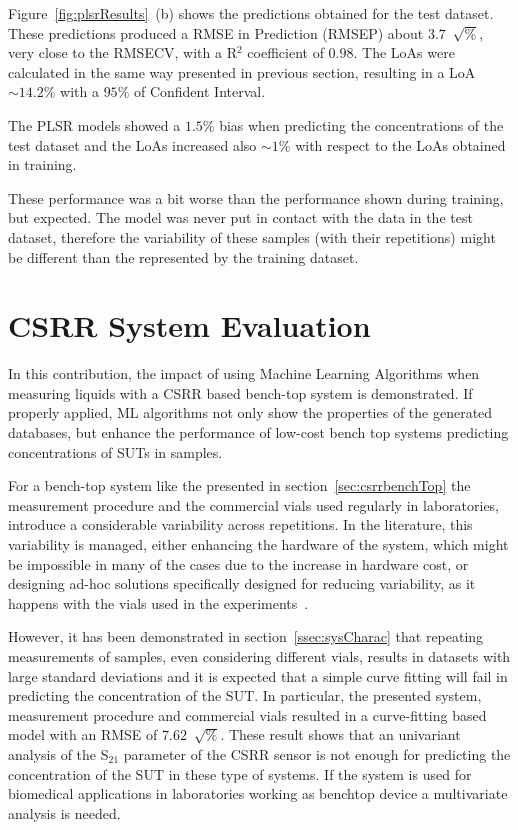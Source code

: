 \documentclass[journal,twoside,web]{ieeecolor}
\begin{document}
Figure~\ref{fig:plsrResults}~(b) shows the predictions obtained for the test dataset. These predictions produced a RMSE in Prediction (RMSEP) about $3.7$~$\sqrt{\%}$, very close to the RMSECV, with a R$^{2}$ coefficient of $0.98$. The LoAs were calculated in the same way presented in previous section, resulting in a LoA~$\sim14.2\%$ with a $95\%$ of Confident Interval. 

The PLSR models showed a $1.5\%$ bias when predicting the concentrations of the test dataset and the LoAs increased also $\sim1\%$ with respect to the LoAs obtained in training. 

These performance was a bit worse than the performance shown during training, but expected. The model was never put in contact with the data in the test dataset, therefore the variability of these samples (with their repetitions) might be different than the represented by the training dataset.

\section{CSRR System Evaluation}
\label{sec:csrrEval}

In this contribution, the impact of using Machine Learning Algorithms when measuring liquids with a CSRR based bench-top system is demonstrated. If properly applied, ML algorithms not only show the properties of the generated databases, but enhance the performance of low-cost bench top systems predicting concentrations of SUTs in samples.

For a bench-top system like the presented in section~\ref{sec:csrrbenchTop} the measurement procedure and the commercial vials used regularly in laboratories, introduce a considerable variability across repetitions. In the literature, this variability is managed, either enhancing the hardware of the system, which might be impossible in many of the cases due to the increase in hardware cost, or designing ad-hoc solutions specifically designed for reducing variability, as it happens with the vials used in the experiments~\cite{Omer2020, Omer2021}. 

However, it has been demonstrated in section~\ref{ssec:sysCharac} that repeating measurements of samples, even considering different vials, results in datasets with large standard deviations and it is expected that a simple curve fitting will fail in predicting the concentration of the SUT. In particular, the presented system, measurement procedure and commercial vials resulted in a curve-fitting based model with an RMSE of $7.62$~$\sqrt{\%}$. These result shows that an univariant analysis of the S$_{21}$ parameter of the CSRR sensor is not enough for predicting the concentration of the SUT in these type of systems. If the system is used for biomedical applications in laboratories working as benchtop device a multivariate analysis is needed. 
\end{document}
